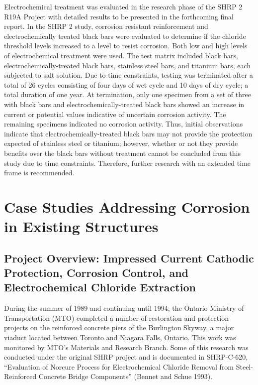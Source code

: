 Electrochemical treatment was evaluated in the research phase of the SHRP 2 R19A Project with detailed results
to be presented in the forthcoming final report. In the SHRP 2 study, corrosion resistant reinforcement and
electrochemically treated black bars were evaluated to determine if the chloride threshold levels increased to a level to resist corrosion. Both low and high levels of electrochemical treatment were used. The test matrix included black
bars, electrochemically-treated black bars, stainless steel bars, and titanium bars, each subjected to salt solution. Due
to time constraints, testing was terminated after a total of 26 cycles consisting of four days of wet cycle and 10 days
of dry cycle; a total duration of one year. At termination, only one specimen from a set of three with black bars and
electrochemically-treated black bars showed an increase in current or potential values indicative of uncertain
corrosion activity. The remaining specimens indicated no corrosion activity. Thus, initial observations indicate that
electrochemically-treated black bars may not provide the protection expected of stainless steel or titanium; however,
whether or not they provide benefits over the black bars without treatment cannot be concluded from this study due
to time constraints. Therefore, further research with an extended time frame is recommended.


\section{Case Studies Addressing Corrosion in Existing Structures}
\label{sec:case-study-addressing-corrosion}
\subsection{Project Overview: Impressed Current Cathodic Protection, Corrosion Control, and Electrochemical Chloride Extraction}
During the summer of 1989 and continuing until 1994, the Ontario Ministry of Transportation (MTO) completed a number of restoration and protection projects on the reinforced concrete piers of the Burlington Skyway, a major viaduct located between Toronto and Niagara Falls, Ontario. This work was monitored by MTO’s Materials and Research Branch. Some of this research was conducted under the original SHRP project and is documented in SHRP-C-620, “Evaluation of Norcure Process for Electrochemical Chloride Removal from Steel-Reinforced Concrete Bridge Components” (Bennet and Schue 1993).

